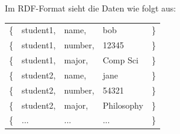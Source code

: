 \documentclass[12pt]{report}
\begin{document}
\begin{enumerate}
  Im RDF-Format sieht die Daten wie folgt aus:

  \begin{center}
    \begin{tabular}{ l l l l l }
      \{ & student1, & name, & bob & \}\\
      \{ & student1, & number, & 12345 & \}\\
      \{ & student1, & major, & Comp Sci & \}\\
      \{ & student2, & name, & jane & \}\\
      \{ & student2, & number, & 54321 & \}\\
      \{ & student2, & major, & Philosophy & \}\\
      \{ & ... & ... & ... & \}
    \end{tabular}
  \end{center}


\end{enumerate}
\end{document}
